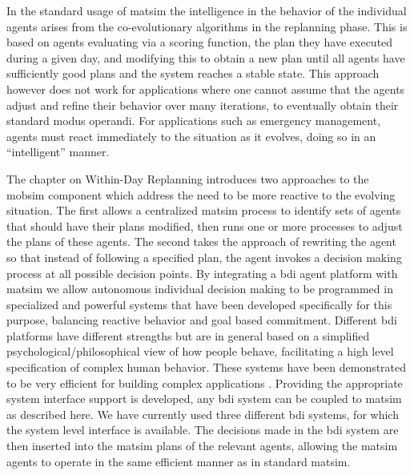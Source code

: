In the standard usage of \gls{matsim} the intelligence in the behavior of
the individual agents arises from the  co-evolutionary algorithms in
the replanning phase. This is based on agents evaluating via a scoring
function, the plan they have executed during a given day, and
modifying this to obtain a new plan until all agents have sufficiently good
plans and the system reaches a stable state. This approach however
does not work for applications where one cannot assume that the agents
adjust and refine their behavior over many iterations, to eventually
obtain their standard modus operandi. For applications such as
emergency management, agents must react immediately to the situation
as it evolves, doing so in an ``intelligent'' manner. 

The chapter on Within-Day Replanning introduces two approaches to the
\gls{mobsim} component which address the need to be more reactive to the
evolving situation. The first allows a centralized \gls{matsim} process to
identify sets of agents that should have their plans modified, then
runs one or more processes to adjust the plans of these agents. The
second takes the approach of rewriting the agent so that instead of
following a specified plan, the agent invokes a decision making
process at all possible decision points. By integrating a \gls{bdi} agent
platform with \gls{matsim} \citep{ecai} we allow autonomous individual
decision making to be programmed in specialized and powerful systems
that have been developed specifically for this purpose, balancing
reactive behavior and goal based commitment. Different \gls{bdi} platforms
have different strengths but are in general based on a simplified
psychological/philosophical view of how people behave, facilitating a
high level specification of complex human behavior. These systems have
been demonstrated to be very efficient for building complex
applications \citep{benfield}.  Providing the appropriate system
interface support is developed, any \gls{bdi} system can be coupled to
\gls{matsim} as described here. We have currently used three different \gls{bdi}
systems, for which the system level interface is available.  The
decisions made in the \gls{bdi} system are then inserted into the \gls{matsim}
plans of the relevant agents, allowing the \gls{matsim} agents to operate in
the same efficient manner as in standard \gls{matsim}.

